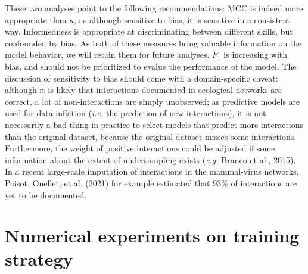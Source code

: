 \documentclass[11pt]{article}
\begin{document}
These two analyses point to the following recommendations: MCC is indeed
more appropriate than \(\kappa\), as although sensitive to bias, it is
sensitive in a consistent way. Informedness is appropriate at
discriminating between different skills, but confounded by bias. As both
of these measures bring valuable information on the model behavior, we
will retain them for future analyses. \(F_1\) is increasing with bias,
and should not be prioritized to evalue the performance of the model.
The discussion of sensitivity to bias should come with a domain-specific
caveat: although it is likely that interactions documented in ecological
networks are correct, a lot of non-interactions are simply unobserved;
as predictive models are used for data-inflation (\emph{i.e.} the
prediction of new interactions), it is not necessarily a bad thing in
practice to select models that predict more interactions than the
original dataset, because the original dataset misses some interactions.
Furthermore, the weight of positive interactions could be adjusted if
some information about the extent of undersampling exists (\emph{e.g.}
Branco et al., 2015). In a recent large-scale imputation of interactions
in the mammal-virus networks, Poisot, Ouellet, et al. (2021) for example
estimated that 93\% of interactions are yet to be documented.

\hypertarget{numerical-experiments-on-training-strategy}{%
\section{Numerical experiments on training
strategy}\label{numerical-experiments-on-training-strategy}}
\end{document}
